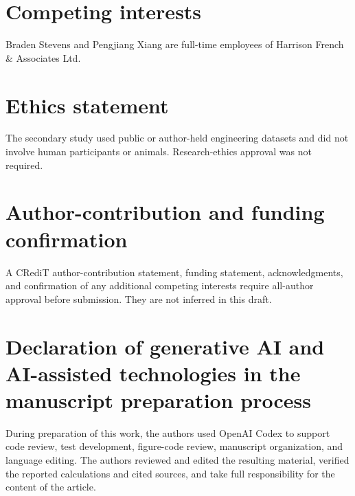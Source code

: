 \documentclass[review,a4paper,fleqn]{cas-sc}
\begin{document}
\section{Competing interests}
Braden Stevens and Pengjiang Xiang are full-time employees of Harrison French \& Associates Ltd.

\section{Ethics statement}
The secondary study used public or author-held engineering datasets and did not involve human participants or animals. Research-ethics approval was not required.

\section{Author-contribution and funding confirmation}
A CRediT author-contribution statement, funding statement, acknowledgments, and confirmation of any additional competing interests require all-author approval before submission. They are not inferred in this draft.

\section{Declaration of generative AI and AI-assisted technologies in the manuscript preparation process}
During preparation of this work, the authors used OpenAI Codex to support code review, test development, figure-code review, manuscript organization, and language editing. The authors reviewed and edited the resulting material, verified the reported calculations and cited sources, and take full responsibility for the content of the article.
\end{document}
